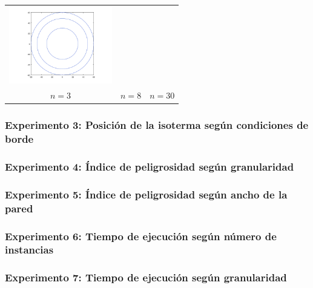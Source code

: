{\begin{tabular}{ccc}
      \includegraphics[width=4.5cm]{graficos/1/1b-30-iso.png} \\
      {\small $n = 3$} &
      {\small $n = 8$} &
      {\small $n = 30$} \\
    \end{tabular}}

  \subsubsection*{Experimento 3: Posición de la isoterma según condiciones de borde}

    

  \subsubsection*{Experimento 4: Índice de peligrosidad según granularidad}

  \subsubsection*{Experimento 5: Índice de peligrosidad según ancho de la pared}

  \subsubsection*{Experimento 6: Tiempo de ejecución según número de instancias}

  \subsubsection*{Experimento 7: Tiempo de ejecución según granularidad}


	
	
	


